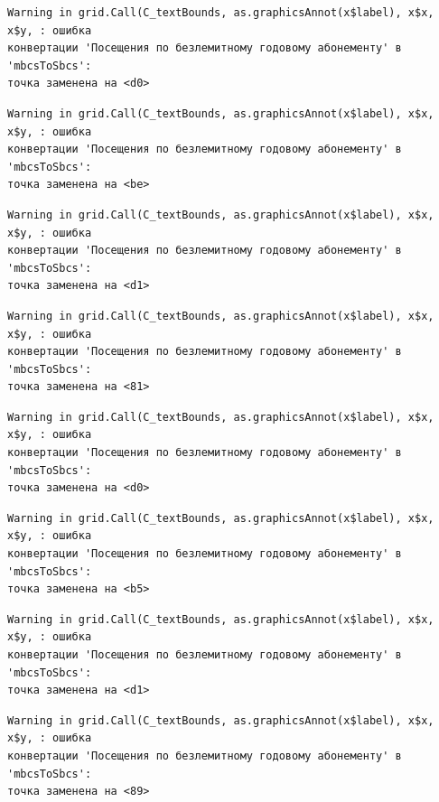 \documentclass[
  letterpaper,
  DIV=11,
  numbers=noendperiod]{scrreprt}
\begin{document}
\begin{verbatim}
Warning in grid.Call(C_textBounds, as.graphicsAnnot(x$label), x$x, x$y, : ошибка
конвертации 'Посещения по безлемитному годовому абонементу' в 'mbcsToSbcs':
точка заменена на <d0>
\end{verbatim}

\begin{verbatim}
Warning in grid.Call(C_textBounds, as.graphicsAnnot(x$label), x$x, x$y, : ошибка
конвертации 'Посещения по безлемитному годовому абонементу' в 'mbcsToSbcs':
точка заменена на <be>
\end{verbatim}

\begin{verbatim}
Warning in grid.Call(C_textBounds, as.graphicsAnnot(x$label), x$x, x$y, : ошибка
конвертации 'Посещения по безлемитному годовому абонементу' в 'mbcsToSbcs':
точка заменена на <d1>
\end{verbatim}

\begin{verbatim}
Warning in grid.Call(C_textBounds, as.graphicsAnnot(x$label), x$x, x$y, : ошибка
конвертации 'Посещения по безлемитному годовому абонементу' в 'mbcsToSbcs':
точка заменена на <81>
\end{verbatim}

\begin{verbatim}
Warning in grid.Call(C_textBounds, as.graphicsAnnot(x$label), x$x, x$y, : ошибка
конвертации 'Посещения по безлемитному годовому абонементу' в 'mbcsToSbcs':
точка заменена на <d0>
\end{verbatim}

\begin{verbatim}
Warning in grid.Call(C_textBounds, as.graphicsAnnot(x$label), x$x, x$y, : ошибка
конвертации 'Посещения по безлемитному годовому абонементу' в 'mbcsToSbcs':
точка заменена на <b5>
\end{verbatim}

\begin{verbatim}
Warning in grid.Call(C_textBounds, as.graphicsAnnot(x$label), x$x, x$y, : ошибка
конвертации 'Посещения по безлемитному годовому абонементу' в 'mbcsToSbcs':
точка заменена на <d1>
\end{verbatim}

\begin{verbatim}
Warning in grid.Call(C_textBounds, as.graphicsAnnot(x$label), x$x, x$y, : ошибка
конвертации 'Посещения по безлемитному годовому абонементу' в 'mbcsToSbcs':
точка заменена на <89>
\end{verbatim}
\end{document}
